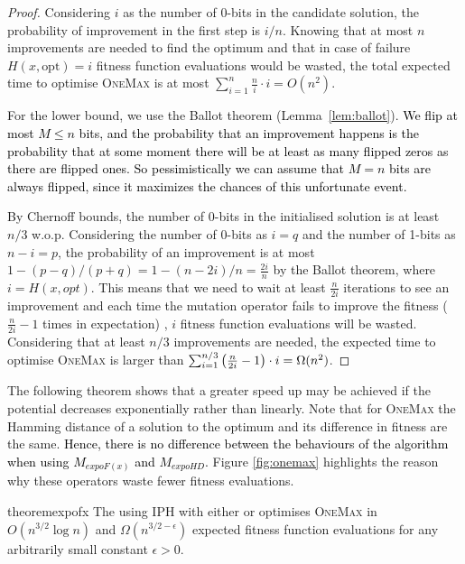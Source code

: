 \documentclass[lettersize,journal]{IEEEtran}
\newcommand{\new}[1]{\textcolor{black}{#1}}
\begin{document}
\begin{proof}
Considering $i$ as the number of 0-bits in the candidate solution, the probability of improvement in the first step is $i/n$. Knowing that at most $n$ improvements are needed to find the optimum and that in case of failure $H(x,\text{opt})=i$ fitness function evaluations would be wasted, the total expected time to optimise \textsc{OneMax} is at most $\sum_{i=1}^n \frac{n}{i} \cdot i =O(n^2)$.

For the lower bound, we use the Ballot theorem (Lemma~\ref{lem:ballot}). 
\new{We flip at most $M \le n$ bits, and the probability that an improvement happens is the probability that at some moment there will be at least as many flipped zeros as there are flipped ones. So pessimistically we can assume that  $M = n$ bits are always flipped, since it maximizes the chances of this unfortunate event.} 

By Chernoff bounds, the number of 0-bits in the initialised solution is at least $n/3$ w.o.p. Considering the number of 
0-bits as $i=q$ and the number of 1-bits as $n-i=p$, the probability of 
an improvement is at most $1-(p-q)/(p+q)=1-(n-2i)/n=\frac{2i}{n}$ by the Ballot theorem, where $i=H(x, opt)$. This means that we need to wait at least $\frac{n}{2i}$ iterations to see an improvement and each time the mutation operator fails to improve the fitness {(\color{black}$\frac{n}{2i} - 1$ times in expectation) }, $i$ fitness function evaluations will be wasted. Considering that at least $n/3$ improvements are needed, the expected time to optimise \textsc{OneMax} is larger than $\sum_{i=1}^{n/3} {\color{black}\left(\frac{n}{2i}-1\right)} \cdot i= \Omega(n^2)$.
\end{proof}

The following theorem shows that a greater speed up may be achieved if the potential decreases exponentially rather than linearly. Note that for \textsc{OneMax} the Hamming distance of a solution to the optimum and its difference in fitness are the same. %
\new{Hence, there is no difference between the behaviours of the algorithm when using $M_{expoF(x)}$ and $M_{expoHD}$.} 
Figure \ref{fig:onemax} highlights the reason why these operators waste fewer fitness evaluations.

\begin{restatable}{theorem}{expofx} \label{cor:omexpohd}
The {\oneoneIA } using IPH with either {\expoF } or {\expoHD } optimises \textsc{OneMax} in $O(n^{3/2} \log 
n)$ and $\Omega(n^{3/2-\epsilon})$ expected fitness function evaluations for 
any arbitrarily small constant $\epsilon>0$.
\end{restatable}
\end{document}
